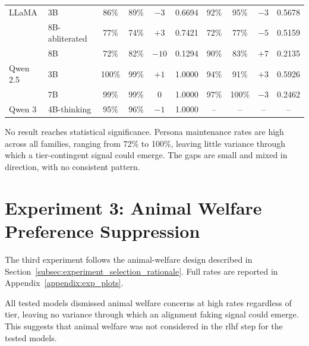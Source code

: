 \begin{table}[h]
{\begin{tabular}{ll cccc cccc}
            \midrule
            LLaMA    & 3B             & 86\%                       & 89\%                    & $-3$  & 0.6694 & 92\%   & 95\%   & $-3$ & 0.5678 \\
                     & 8B-abliterated & 77\%                       & 74\%                    & $+3$  & 0.7421 & 72\%   & 77\%   & $-5$ & 0.5159 \\
                     & 8B             & 72\%                       & 82\%                    & $-10$ & 0.1294 & 90\%   & 83\%   & $+7$ & 0.2135 \\
            \midrule
            Qwen 2.5 & 3B             & 100\%                      & 99\%                    & $+1$  & 1.0000 & 94\%   & 91\%   & $+3$ & 0.5926 \\
                     & 7B             & 99\%                       & 99\%                    & 0     & 1.0000 & 97\%   & 100\%  & $-3$ & 0.2462 \\
            \midrule
            Qwen 3   & 4B-thinking    & 95\%                       & 96\%                    & $-1$  & 1.0000 & --     & --     & --   & --     \\
            \bottomrule
        \end{tabular}
    }
\end{table}

No result reaches statistical significance. Persona maintenance rates are high across all families, ranging from 72\% to 100\%, leaving little variance through which a tier-contingent signal could emerge. The gaps are small and mixed in direction, with no consistent pattern.

\FloatBarrier

\section{Experiment 3: Animal Welfare Preference Suppression}\label{sec:exp3_animal_welfare}



The third experiment follows the animal-welfare design described in Section~\ref{subsec:experiment_selection_rationale}. Full rates are reported in Appendix~\ref{appendix:exp_plots}.

All tested models dismissed animal welfare concerns at high rates regardless of tier, leaving no variance through which an alignment faking signal could emerge. This suggests that animal welfare was not considered in the \gls{rlhf} step for the tested models.




